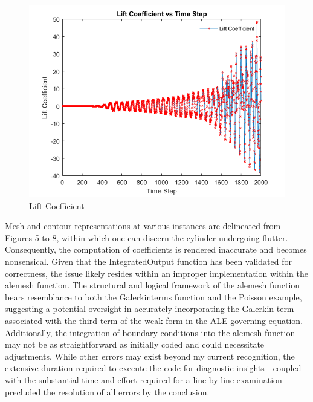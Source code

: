 \documentclass[a4paper,12pt]{article} %
\begin{document}
\begin{figure}[htbp]
    \center
    \includegraphics[scale=0.6]{Cl_1.png}
    \caption{Lift Coefficient}
\end{figure}
Mesh and contour representations at various instances are delineated from Figures 5 to 8, within which one can 
discern the cylinder undergoing flutter. Consequently, the computation of coefficients is rendered inaccurate 
and becomes nonsensical. Given that the IntegratedOutput function has been validated for correctness, the 
issue likely resides within an improper implementation within the alemesh function. The structural and logical 
framework of the alemesh function bears resemblance to both the Galerkinterms function and the Poisson example, 
suggesting a potential oversight in accurately incorporating the Galerkin term associated with the third term of 
the weak form in the ALE governing equation. Additionally, the integration of boundary conditions into the 
alemesh function may not be as straightforward as initially coded and could necessitate adjustments. While 
other errors may exist beyond my current recognition, the extensive duration required to execute the code 
for diagnostic insights—coupled with the substantial time and effort required for a line-by-line 
examination—precluded the resolution of all errors by the conclusion.
\end{document}
